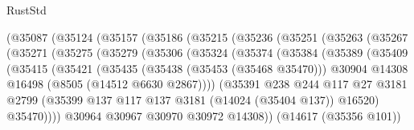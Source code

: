 \begin{lexlean}{RustStd}
\begin{coremodule}
                (@35087
                  (@35124
                    (@35157
                      (@35186
                        (@35215
                          (@35236
                            (@35251
                              (@35263
                                (@35267
                                  (@35271
                                    (@35275
                                      (@35279
                                        (@35306
                                          (@35324
                                            (@35374
                                              (@35384
                                                (@35389
                                                  (@35409
                                                    (@35415
                                                      (@35421
                                                        (@35435
                                                          (@35438 (@35453 (@35468 @35470)))
                                                          @30904
                                                          @14308
                                                          @16498
                                                          (@8505 (@14512 @6630 @2867))))
                                                      (@35391
                                                        @238
                                                        @244
                                                        @117
                                                        @27
                                                        @3181
                                                        @2799
                                                        (@35399
                                                          @137
                                                          @117
                                                          @137
                                                          @3181
                                                          (@14024 (@35404 @137))
                                                          @16520)
                                                        @35470))))
                                                @30964
                                                @30967
                                                @30970
                                                @30972
                                                @14308))
                                            (@14617 (@35356 @101))

\end{coremodule}
\end{lexlean}

